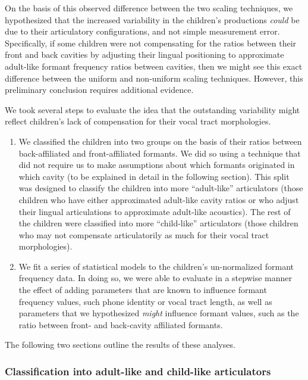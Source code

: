 \documentclass[
]{article}
\begin{document}
On the basis of this observed difference between the two scaling techniques, we hypothesized that the increased variability in the children's productions \emph{could} be due to their articulatory configurations, and not simple measurement error. Specifically, if some children were not compensating for the ratios between their front and back cavities by adjusting their lingual positioning to approximate adult-like formant frequency ratios between cavities, then we might see this exact difference between the uniform and non-uniform scaling techniques. However, this preliminary conclusion requires additional evidence.

We took several steps to evaluate the idea that the outstanding variability might reflect children's lack of compensation for their vocal tract morphologies.

\begin{enumerate}
\def\labelenumi{\arabic{enumi}.}
\item
  We classified the children into two groups on the basis of their ratios between back-affiliated and front-affiliated formants. We did so using a technique that did not require us to make assumptions about which formants originated in which cavity (to be explained in detail in the following section). This split was designed to classify the children into more ``adult-like'' articulators (those children who have either approximated adult-like cavity ratios or who adjust their lingual articulations to approximate adult-like acoustics). The rest of the children were classified into more ``child-like'' articulators (those children who may not compensate articulatorily as much for their vocal tract morphologies).
\item
  We fit a series of statistical models to the children's un-normalized formant frequency data. In doing so, we were able to evaluate in a stepwise manner the effect of adding parameters that are known to influence formant frequency values, such phone identity or vocal tract length, as well as parameters that we hypothesized \emph{might} influence formant values, such as the ratio between front- and back-cavity affiliated formants.
\end{enumerate}

The following two sections outline the results of these analyses.

\hypertarget{classification-into-adult-like-and-child-like-articulators}{%
\subsubsection{Classification into adult-like and child-like articulators}\label{classification-into-adult-like-and-child-like-articulators}}
\end{document}
